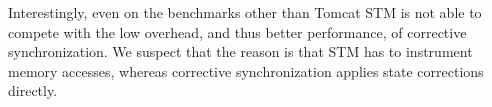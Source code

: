 Interestingly, even on the benchmarks other than Tomcat STM is not able to compete with the low overhead, and thus better performance, of corrective synchronization. We suspect that the reason is that STM has to instrument memory accesses, whereas corrective synchronization applies state corrections directly.

%
%
%
%
%
